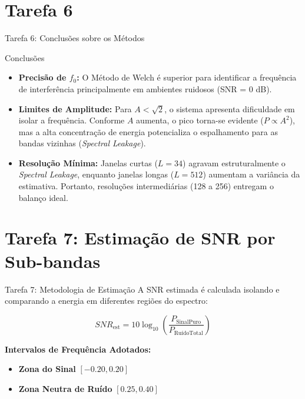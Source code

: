 \documentclass[10pt]{beamer}
\begin{document}
\section{Tarefa 6}
\begin{frame}{Tarefa 6: Conclusões sobre os Métodos}
    \begin{block}{Conclusões}
    \begin{itemize}
        \item \textbf{Precisão de $f_0$:} O Método de Welch é superior para
            identificar a frequência de interferência principalmente em ambientes ruidosos
            (SNR = 0 dB).
        \item \textbf{Limites de Amplitude:} Para $A < \sqrt{2}$, o sistema
            apresenta dificuldade em isolar a frequência. Conforme $A$ aumenta,
            o pico torna-se evidente ($P \propto A^2$), mas a alta concentração
            de energia potencializa o espalhamento para as bandas vizinhas
            (\textit{Spectral Leakage}).
        \item \textbf{Resolução Mínima:} Janelas curtas ($L =
            34$) agravam estruturalmente o \textit{Spectral Leakage}, enquanto
            janelas longas ($L = 512$) aumentam a variância da estimativa.
            Portanto, resoluções intermediárias (128 a 256) entregam o balanço
            ideal.
    \end{itemize}
    \end{block}
\end{frame}

\section{Tarefa 7: Estimação de SNR por Sub-bandas}

\begin{frame}{Tarefa 7: Metodologia de Estimação}
    A SNR estimada é calculada isolando e comparando a energia em diferentes regiões do espectro:
    
    \begin{equation*}
        SNR_{\text{est}} = 10 \log_{10} \left( \frac{P_{\text{SinalPuro}}}{P_{\text{RuídoTotal}}} \right)
    \end{equation*}
    
    \vspace{0.3cm}
    \textbf{Intervalos de Frequência Adotados:}
    \begin{itemize}
        \item \textbf{Zona do Sinal} $[ -0.20, 0.20 ]$
        \item \textbf{Zona Neutra de Ruído} $[ 0.25, 0.40 ]$
    \end{itemize}
\end{frame}
\end{document}
